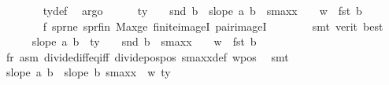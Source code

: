 \begin{isabellebody}
\ \ \ \ \ \ \isamarkupfalse%
\ ty{}{\isacharunderscore}{\kern0pt}def\ \isamarkupfalse%
\ argo\isanewline
\ \ \ \ \isamarkupfalse%
\ {\isachardoublequoteopen}ty{}\ {\isacharplus}{\kern0pt}\ {}\ {\isachargreater}{\kern0pt}\ snd\ b\ {\isacharplus}{\kern0pt}\ {\isacharparenleft}{\kern0pt}{\isacharparenleft}{\kern0pt}slope\ a\ b{\isacharparenright}{\kern0pt}\ {\isacharasterisk}{\kern0pt}\ {\isacharparenleft}{\kern0pt}s{}{\isacharunderscore}{\kern0pt}maxx\ {\isacharplus}{\kern0pt}\ {}\ {\isacharplus}{\kern0pt}\ w{}\ {\isacharminus}{\kern0pt}\ fst\ b{\isacharparenright}{\kern0pt}{\isacharparenright}{\kern0pt}{\isachardoublequoteclose}\isanewline
\ \ \ \ \ \ \isamarkupfalse%
\ f{}\ s{}pr{\isacharunderscore}{\kern0pt}ne\ s{}pr{\isacharunderscore}{\kern0pt}fin\ Max{\isacharunderscore}{\kern0pt}ge\ finite{\isacharunderscore}{\kern0pt}imageI\ pair{\isacharunderscore}{\kern0pt}imageI\isanewline
\ \ \ \ \ \ \isamarkupfalse%
\ {\isacharparenleft}{\kern0pt}smt\ {\isacharparenleft}{\kern0pt}verit{\isacharcomma}{\kern0pt}\ best{\isacharparenright}{\kern0pt}{\isacharparenright}{\kern0pt}\isanewline
\ \ \ \ \isamarkupfalse%
\ {\isachardoublequoteopen}slope\ a\ b\ {\isacharless}{\kern0pt}\ {\isacharparenleft}{\kern0pt}ty{}\ {\isacharplus}{\kern0pt}\ {}\ {\isacharminus}{\kern0pt}\ snd\ b{\isacharparenright}{\kern0pt}\ {\isacharslash}{\kern0pt}\ {\isacharparenleft}{\kern0pt}s{}{\isacharunderscore}{\kern0pt}maxx\ {\isacharplus}{\kern0pt}\ {}\ {\isacharplus}{\kern0pt}\ w{}\ {\isacharminus}{\kern0pt}\ fst\ b{\isacharparenright}{\kern0pt}{\isachardoublequoteclose}\isanewline
\ \ \ \ \ \isamarkupfalse%
\ f{}r{}\ asm\ divide{\isacharunderscore}{\kern0pt}diff{\isacharunderscore}{\kern0pt}eq{\isacharunderscore}{\kern0pt}iff\ divide{\isacharunderscore}{\kern0pt}pos{\isacharunderscore}{\kern0pt}pos\ s{}{\isacharunderscore}{\kern0pt}maxx{\isacharunderscore}{\kern0pt}def\ w{}{\isacharunderscore}{\kern0pt}pos\ \isamarkupfalse%
\ smt\isanewline
\ \ \ \ \isamarkupfalse%
\ {\isachardoublequoteopen}slope\ a\ b\ {\isacharless}{\kern0pt}\ slope\ b\ {\isacharparenleft}{\kern0pt}s{}{\isacharunderscore}{\kern0pt}maxx{\isacharplus}{\kern0pt}{}\ {\isacharplus}{\kern0pt}\ w{}{\isacharcomma}{\kern0pt}\ ty{}{\isacharplus}{\kern0pt}{}{\isacharparenright}{\kern0pt}{\isachardoublequoteclose}\ \isamarkupfalse%

\end{isabellebody}
